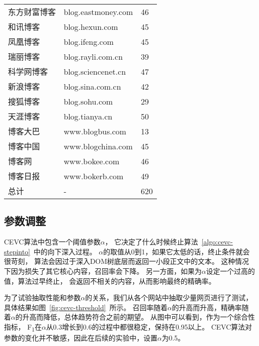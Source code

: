 \begin{table}[htbp]
\begin{minipage}{0.45\textwidth}
\begin{tabular}{lll}
东方财富博客 & blog.eastmoney.com & 46 \\
和讯博客 & blog.hexun.com & 45 \\
凤凰博客 & blog.ifeng.com & 45 \\
瑞丽博客 & blog.rayli.com.cn & 39 \\
科学网博客 & blog.sciencenet.cn & 47 \\
新浪博客 & blog.sina.com.cn & 42 \\
搜狐博客 & blog.sohu.com & 29 \\
天涯博客 & blog.tianya.cn & 50 \\
博客大巴 & www.blogbus.com & 13 \\
博客中国 & www.blogchina.com & 45 \\
博客网 & www.bokee.com & 46 \\
博客日报 & www.bokerb.com & 49 \\
总计 & - & 620 \\
\bottomrule[1.5pt]
\end{tabular}
\end{minipage}
\end{table}

\subsection{参数调整}
CEVC算法中包含一个阈值参数$\alpha$，
它决定了什么时候终止算法~\ref{algo:cevc-stepinto}~中的向下深入过程。
$\alpha$的取值从0到1，如果它太低的话，终止条件就会很苛刻，
算法会因过于深入DOM树底层而返回一小段正文中的文本。
这种情况下因为损失了其它核心内容，召回率会下降。
另一方面，如果为$\alpha$设定一个过高的值，算法过早终止，
会返回不相关的内容，从而影响最终的精确率。

为了试验抽取性能和参数$\alpha$的关系，我们从各个网站中抽取少量网页进行了测试，
具体结果如图~\ref{fig:cevc-threshold}~所示。
召回率随着$\alpha$的升高而升高，精确率随着$\alpha$的升高而降低，总体趋势符合之前的期望。
从图中可以看到，作为一个综合性指标，
F\textsubscript{1}在$\alpha$从0.3增长到0.6的过程中都很稳定，保持在0.95以上。
CEVC算法对参数的变化并不敏感，因此在后续的实验中，设置$\alpha$为0.5。

